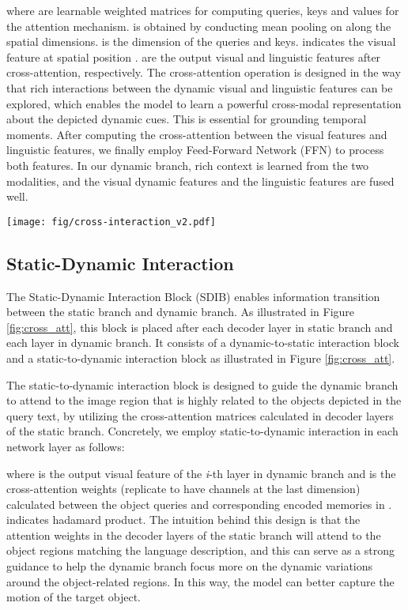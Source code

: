 \documentclass[sigconf]{acmart}
\begin{document}
where  are learnable weighted matrices for computing queries, keys and values for the attention mechanism.  is obtained by conducting mean pooling on  along the spatial dimensions.  is the dimension of the queries and keys.  indicates the visual feature at spatial position .  are the output visual and linguistic features after cross-attention, respectively. The cross-attention operation is designed in the way that rich interactions between the dynamic visual and linguistic features can be explored, which enables the model to learn a powerful cross-modal representation about the depicted dynamic cues. This is essential for grounding temporal moments. After computing the cross-attention between the visual features and linguistic features, we finally employ Feed-Forward Network (FFN) to process both features. In our dynamic branch, rich context is learned from the two modalities, and the visual dynamic features and the linguistic features are fused well.

\begin{figure*}[t]
  \centering
  \texttt{[image: fig/cross-interaction\_v2.pdf]}
  \caption{The architectures of the proposed Static-Dynamic Interaction Block.}
    \label{fig:cross_att}
\end{figure*}

\subsection{Static-Dynamic Interaction}
The Static-Dynamic Interaction Block (SDIB) enables information transition between the static branch and dynamic branch. As illustrated in Figure \ref{fig:cross_att}, this block is placed after each decoder layer  in static branch and each layer  in dynamic branch. It consists of a dynamic-to-static interaction block and a static-to-dynamic interaction block as illustrated in Figure \ref{fig:cross_att}. 

The static-to-dynamic interaction block is designed to guide the dynamic branch to attend to the image region that is highly related to the objects depicted in the query text, by utilizing the cross-attention matrices calculated in decoder layers of the static branch. Concretely, we employ static-to-dynamic interaction in each network layer as follows:

where  is the output visual feature of the \emph{i}-th layer in dynamic branch and  is the cross-attention weights (replicate to have  channels at the last dimension) calculated between the object queries  and corresponding encoded memories  in .  indicates hadamard product. The intuition behind this design is that the attention weights in the decoder layers of the static branch will attend to the object regions matching the language description, and this can serve as a strong guidance to help the dynamic branch focus more on the dynamic variations around the object-related regions. In this way, the model can better capture the motion of the target object. 
\end{document}
